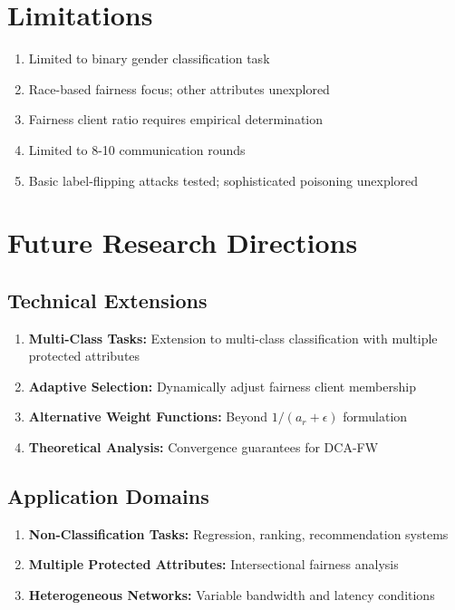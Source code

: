 \documentclass[11pt,a4paper]{report}
\begin{document}
\section{Limitations}

\begin{enumerate}
    \item Limited to binary gender classification task
    \item Race-based fairness focus; other attributes unexplored
    \item Fairness client ratio requires empirical determination
    \item Limited to 8-10 communication rounds
    \item Basic label-flipping attacks tested; sophisticated poisoning unexplored
\end{enumerate}

\section{Future Research Directions}

\subsection{Technical Extensions}

\begin{enumerate}
    \item \textbf{Multi-Class Tasks:} Extension to multi-class classification with multiple protected attributes
    \item \textbf{Adaptive Selection:} Dynamically adjust fairness client membership
    \item \textbf{Alternative Weight Functions:} Beyond $1/(a_r + \epsilon)$ formulation
    \item \textbf{Theoretical Analysis:} Convergence guarantees for DCA-FW
\end{enumerate}

\subsection{Application Domains}

\begin{enumerate}
    \item \textbf{Non-Classification Tasks:} Regression, ranking, recommendation systems
    \item \textbf{Multiple Protected Attributes:} Intersectional fairness analysis
    \item \textbf{Heterogeneous Networks:} Variable bandwidth and latency conditions
\end{enumerate}
\end{document}
